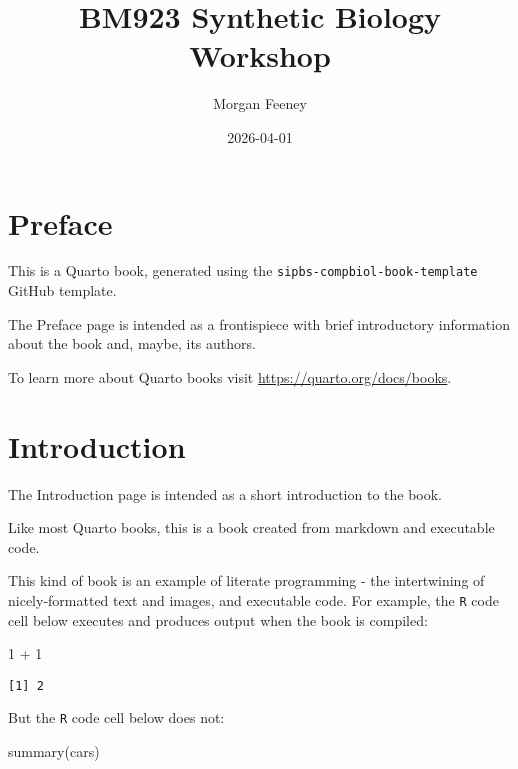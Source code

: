 \documentclass[
  letterpaper,
  DIV=11,
  numbers=noendperiod]{scrreprt}
\title{BM923 Synthetic Biology Workshop}
\author{Morgan Feeney}
\date{2026-04-01}
\newenvironment{Shaded}{\begin{snugshade}}{\end{snugshade}}
\newcommand{\DecValTok}[1]{\textcolor[rgb]{0.68,0.00,0.00}{#1}}
\newcommand{\FunctionTok}[1]{\textcolor[rgb]{0.28,0.35,0.67}{#1}}
\newcommand{\NormalTok}[1]{\textcolor[rgb]{0.00,0.23,0.31}{#1}}
\newcommand{\SpecialCharTok}[1]{\textcolor[rgb]{0.37,0.37,0.37}{#1}}
\renewcommand*\contentsname{Table of contents}
\newcommand\contentsname{Table of contents}
\begin{document}
\maketitle

\renewcommand*\contentsname{Table of contents}
{
\hypersetup{linkcolor=}
\setcounter{tocdepth}{2}
\tableofcontents
}


\chapter*{Preface}\label{preface}


This is a Quarto book, generated using the
\texttt{sipbs-compbiol-book-template} GitHub template.

The Preface page is intended as a frontispiece with brief introductory
information about the book and, maybe, its authors.

To learn more about Quarto books visit
\url{https://quarto.org/docs/books}.


\chapter{Introduction}\label{introduction}

The Introduction page is intended as a short introduction to the book.

Like most Quarto books, this is a book created from markdown and
executable code.

This kind of book is an example of literate programming - the
intertwining of nicely-formatted text and images, and executable code.
For example, the \texttt{R} code cell below executes and produces output
when the book is compiled:

\begin{Shaded}
\begin{Highlighting}[]
\DecValTok{1} \SpecialCharTok{+} \DecValTok{1}
\end{Highlighting}
\end{Shaded}

\begin{verbatim}
[1] 2
\end{verbatim}

But the \texttt{R} code cell below does not:

\begin{Shaded}
\begin{Highlighting}[]
\FunctionTok{summary}\NormalTok{(cars)}
\end{Highlighting}
\end{Shaded}
\end{document}
